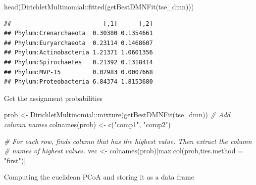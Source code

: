 \documentclass[
]{book}
\newenvironment{Shaded}{\begin{snugshade}}{\end{snugshade}}
\newcommand{\AttributeTok}[1]{\textcolor[rgb]{0.77,0.63,0.00}{#1}}
\newcommand{\CommentTok}[1]{\textcolor[rgb]{0.56,0.35,0.01}{\textit{#1}}}
\newcommand{\FunctionTok}[1]{\textcolor[rgb]{0.00,0.00,0.00}{#1}}
\newcommand{\NormalTok}[1]{#1}
\newcommand{\OtherTok}[1]{\textcolor[rgb]{0.56,0.35,0.01}{#1}}
\newcommand{\SpecialCharTok}[1]{\textcolor[rgb]{0.00,0.00,0.00}{#1}}
\newcommand{\StringTok}[1]{\textcolor[rgb]{0.31,0.60,0.02}{#1}}
\begin{document}
\begin{Shaded}
\begin{Highlighting}[]
\FunctionTok{head}\NormalTok{(DirichletMultinomial}\SpecialCharTok{::}\FunctionTok{fitted}\NormalTok{(}\FunctionTok{getBestDMNFit}\NormalTok{(tse\_dmn)))}
\end{Highlighting}
\end{Shaded}

\begin{verbatim}
##                          [,1]      [,2]
## Phylum:Crenarchaeota  0.30380 0.1354661
## Phylum:Euryarchaeota  0.23114 0.1468607
## Phylum:Actinobacteria 1.21371 1.0601356
## Phylum:Spirochaetes   0.21392 0.1318414
## Phylum:MVP-15         0.02983 0.0007668
## Phylum:Proteobacteria 6.84374 1.8153680
\end{verbatim}

Get the assignment probabilities

\begin{Shaded}
\begin{Highlighting}[]
\NormalTok{prob }\OtherTok{\textless{}{-}}\NormalTok{ DirichletMultinomial}\SpecialCharTok{::}\FunctionTok{mixture}\NormalTok{(}\FunctionTok{getBestDMNFit}\NormalTok{(tse\_dmn))}
\CommentTok{\# Add column names}
\FunctionTok{colnames}\NormalTok{(prob) }\OtherTok{\textless{}{-}} \FunctionTok{c}\NormalTok{(}\StringTok{"comp1"}\NormalTok{, }\StringTok{"comp2"}\NormalTok{)}

\CommentTok{\# For each row, finds column that has the highest value. Then extract the column }
\CommentTok{\# names of highest values.}
\NormalTok{vec }\OtherTok{\textless{}{-}} \FunctionTok{colnames}\NormalTok{(prob)[}\FunctionTok{max.col}\NormalTok{(prob,}\AttributeTok{ties.method =} \StringTok{"first"}\NormalTok{)]}
\end{Highlighting}
\end{Shaded}

Computing the euclidean PCoA and storing it as a data frame
\end{document}
